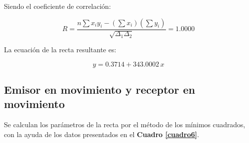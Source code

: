 \documentclass[letter,11pt]{article}
\begin{document}
Siendo el coeficiente de correlación:

\begin{equation*}
    R = \frac{n \sum x_i y_i - (\sum x_i)(\sum y_i)}{\sqrt{\Delta_1 \Delta_2}}
      = 1.0000
\end{equation*}
\vspace{0.10cm}

La ecuación de la recta resultante es:

\begin{equation*}
    y = 0.3714 + 343.0002\,x
\end{equation*}
\vspace{0.10cm}

\subsection{Emisor en movimiento y receptor en movimiento}

Se calculan los parámetros de la recta por el método de los mínimos cuadrados,
con la ayuda de los datos presentados en el \textbf{Cuadro \ref{cuadro6}}.
\end{document}
